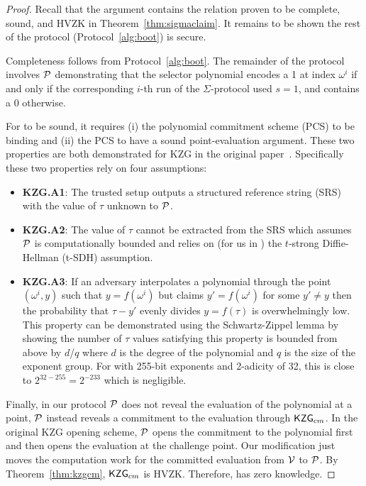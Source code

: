 \begin{proof}
Recall that the \bootstrap argument contains the relation proven to be complete, sound, and HVZK in Theorem~\ref{thm:sigmaclaim}. It remains to be shown the rest of the protocol (Protocol~\ref{alg:boot}) is secure.

Completeness follows from Protocol~\ref{alg:boot}. The remainder of the protocol involves $\mathcal{P}$ demonstrating that the selector polynomial encodes a 1 at index $\omega^i$ if and only if the corresponding $i$-th run of the $\Sigma$-protocol used $s=1$, and contains a 0 otherwise.

For \bootstrap to be sound, it requires (i) the polynomial commitment scheme (PCS) to be binding and (ii) the PCS to have a sound point-evaluation argument. These two properties are both demonstrated for KZG in the original paper~\cite{kzg}. Specifically these two properties rely on four assumptions:
\begin{itemize}
\item \textbf{KZG.A1}: The trusted setup outputs a structured reference string (SRS) with the value of $\tau$ unknown to $\mathcal{P}$. 
\item \textbf{KZG.A2}: The value of $\tau$ cannot be extracted from the SRS which assumes $\mathcal{P}$ is computationally bounded and relies on (for us in \bls) the $t$-strong Diffie-Hellman (t-SDH) assumption.
\item \textbf{KZG.A3}: If an adversary interpolates a polynomial through the point $(\omega^i,y)$ such that $y=f(\omega^i)$ but claims $y'=f(\omega^i)$ for some $y'\neq y$ then the probability that $\tau-y'$ evenly divides $y=f(\tau)$ is overwhelmingly low. This property can be demonstrated using the Schwartz-Zippel lemma by showing the number of $\tau$ values satisfying this property is bounded from above by $d$/$q$ where $d$ is the degree of the polynomial and $q$ is the size of the exponent group. For \bls with 255-bit exponents and 2-adicity of 32, this is close to $2^{32-255}=2^{-233}$ which is negligible.
\end{itemize}

Finally, in our protocol $\mathcal{P}$ does not reveal the evaluation of the polynomial at a point, $\mathcal{P}$ instead reveals a commitment to the evaluation through $\mathsf{KZG}_{cm}$. In the original KZG opening scheme, $\mathcal{P}$ opens the commitment to the polynomial first and then opens the evaluation at the challenge point. Our modification just moves the computation work for the committed evaluation from $\mathcal{V}$ to $\mathcal{P}$. By Theorem~\ref{thm:kzgcm}, $\mathsf{KZG}_{cm}$ is HVZK. Therefore, \bootstrap has zero knowledge.
\end{proof}

